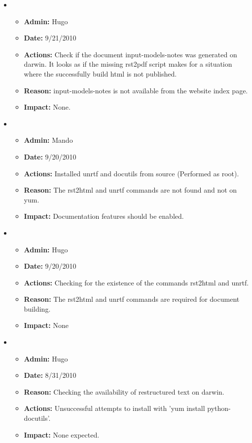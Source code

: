 \documentclass[12pt]{article}
\begin{document}
\begin{itemize}
\item 
\begin{itemize}
\item[] {\bf Admin:} Hugo
\item[] {\bf Date:} 9/21/2010 
\item[] {\bf Actions:} Check if the document input-models-notes was
  generated on darwin.  It looks as if the missing rst2pdf script
  makes for a situation where the successfully build html is not
  published.
\item[] {\bf Reason:} input-models-notes is not available from the
  website index page.
\item[] {\bf Impact:} None.
\end{itemize}

\item 
\begin{itemize}
\item[] {\bf Admin:} Mando
\item[] {\bf Date:} 9/20/2010 
\item[] {\bf Actions:} Installed unrtf and docutils from source (Performed as root).
\item[] {\bf Reason:} The rst2html and unrtf commands are not found and not on yum.
\item[] {\bf Impact:} Documentation features should be enabled.
\end{itemize}

\item 
\begin{itemize}
\item[] {\bf Admin:} Hugo
\item[] {\bf Date:} 9/20/2010 
\item[] {\bf Actions:} Checking for the existence of the commands
  rst2html and unrtf. 
\item[] {\bf Reason:} The rst2html and unrtf commands are required for
  document building.
\item[] {\bf Impact:} None
\end{itemize}
	
\item 
\begin{itemize}
\item[] {\bf Admin:} Hugo
\item[] {\bf Date:} 8/31/2010
\item[] {\bf Reason:} Checking the availability of restructured text on darwin.
\item[] {\bf Actions:} Unsuccessful attempts to install with 'yum install python-docutils'.
\item[] {\bf Impact:} None expected.
\end{itemize}


\end{itemize}
\end{document}
